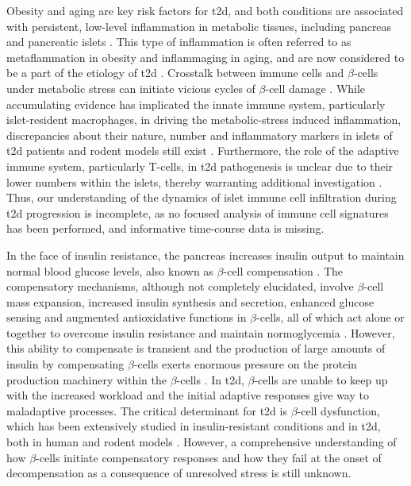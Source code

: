 \par Obesity and aging are key risk factors for \gls{t2d}, and both conditions are associated with persistent, low-level inflammation in metabolic tissues, including pancreas and pancreatic islets \textbf{\cite{schulze_dietary_2005,donath_inflammation_2013,lee_integrated_2018,ying_role_2019}}. This type of inflammation is often referred to as metaflammation in obesity and inflammaging in aging, and are now considered to be a part of the etiology of \gls{t2d} \textbf{\cite{prattichizzo_inflammageing_2018}}. Crosstalk between immune cells and $\beta$-cells under metabolic stress can initiate vicious cycles of $\beta$-cell damage \textbf{\cite{cosentino_crosstalk_2021}}. While accumulating evidence has implicated the innate immune system, particularly islet-resident macrophages, in driving the metabolic-stress induced inflammation, discrepancies about their nature, number and inflammatory markers in islets of \gls{t2d} patients and rodent models still exist \textbf{\cite{eguchi_islet_2017, cuenco_islet_2022}}. Furthermore, the role of the adaptive immune system, particularly T-cells, in \gls{t2d} pathogenesis is unclear due to their lower numbers within the islets, thereby warranting additional investigation \textbf{\cite{ying_role_2019}}. Thus, our understanding of the dynamics of islet immune cell infiltration during \gls{t2d} progression is incomplete, as no focused analysis of immune cell signatures has been performed, and informative time-course data is missing.\\

\par In the face of insulin resistance, the pancreas increases insulin output to maintain normal blood glucose levels, also known as $\beta$-cell compensation \textbf{\cite{prentki_islet_2006}}. The compensatory mechanisms, although not completely elucidated, involve $\beta$-cell mass expansion, increased insulin synthesis and secretion, enhanced glucose sensing and augmented antioxidative functions in $\beta$-cells, all of which act alone or together to overcome insulin resistance and maintain normoglycemia \textbf{\cite{prentki_islet_2006,hudish__2019}}. However, this ability to compensate is transient and the production of large amounts of insulin by compensating $\beta$-cells exerts enormous pressure on the protein production machinery within the $\beta$-cells \textbf{\cite{yong_therapeutic_2021}}. In \gls{t2d}, $\beta$-cells are unable to keep up with the increased workload and the initial adaptive responses give way to maladaptive processes. The critical determinant for \gls{t2d} is $\beta$-cell dysfunction, which has been extensively studied in insulin-resistant conditions and in \gls{t2d}, both in human and rodent models \textbf{\cite{khin_pancreatic_2023, covington_animal_2024}}. However, a comprehensive understanding of how $\beta$-cells initiate compensatory responses and how they fail at the onset of decompensation as a consequence of unresolved stress is still unknown.\\
 
